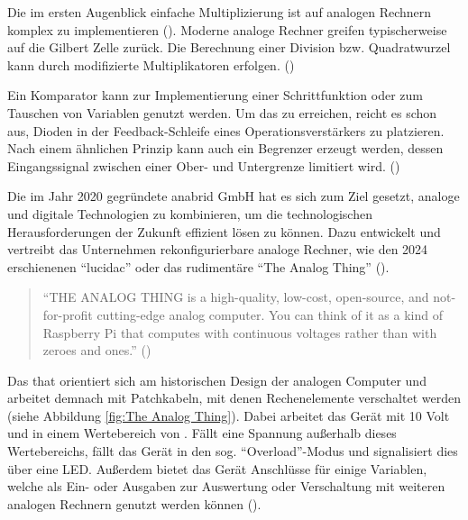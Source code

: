 Die im ersten Augenblick einfache Multiplizierung ist auf analogen Rechnern komplex zu implementieren (\cite[vgl. S. 105]{Ulmann2022}). Moderne analoge Rechner greifen typischerweise auf die Gilbert Zelle zurück. Die Berechnung einer Division bzw. Quadratwurzel kann durch modifizierte Multiplikatoren erfolgen. (\cite[S. 114 f.]{Ulmann2022})

Ein Komparator kann \zb zur Implementierung einer Schrittfunktion oder zum Tauschen von Variablen genutzt werden. Um das zu erreichen, reicht es schon aus, Dioden in der Feedback-Schleife eines Operationsverstärkers zu platzieren. Nach einem ähnlichen Prinzip kann auch ein Begrenzer erzeugt werden, dessen Eingangssignal zwischen einer Ober- und Untergrenze limitiert wird. (\cite[S. 116]{Ulmann2022})

Die im Jahr 2020 gegründete anabrid GmbH hat es sich zum Ziel gesetzt, analoge und digitale Technologien zu kombinieren, um die technologischen Herausforderungen der Zukunft effizient lösen zu können. Dazu entwickelt und vertreibt das Unternehmen rekonfigurierbare analoge Rechner, wie den 2024 erschienenen "`lucidac"' oder das rudimentäre "`The Analog Thing"' (\cite{website:anabrid:homepage}).

\begin{quote}
  "`THE ANALOG THING is a high-quality, low-cost, open-source, and not-for-profit cutting-edge analog computer. You can think of it as a kind of Raspberry Pi that computes with continuous voltages rather than with zeroes and ones."' (\cite{website:anabrid:that-docs})
\end{quote}

Das \ac{that} orientiert sich am historischen Design der analogen Computer und arbeitet demnach mit Patchkabeln, mit denen Rechenelemente verschaltet werden (siehe Abbildung \ref{fig:The Analog Thing}). Dabei arbeitet das Gerät mit 10 Volt und in einem Wertebereich von . Fällt eine Spannung außerhalb dieses Wertebereichs, fällt das Gerät in den sog. "`Overload"'-Modus und signalisiert dies über eine LED. Außerdem bietet das Gerät Anschlüsse für einige Variablen, welche als Ein- oder Ausgaben zur Auswertung oder Verschaltung mit weiteren analogen Rechnern genutzt werden können (\cite{website:anabrid:that-docs}).

